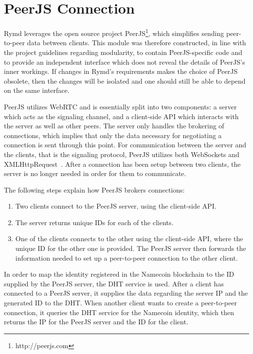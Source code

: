 \section{PeerJS Connection}
\label{sec:p2p}

Rymd leverages the open source project PeerJS\footnote{http://peerjs.com}, which simplifies sending peer-to-peer data between clients. This module was therefore constructed, in line with the project guidelines regarding modularity, to contain PeerJS-specific code and to provide an independent interface which does not reveal the details of PeerJS's inner workings. If changes in Rymd's requirements makes the choice of PeerJS obsolete, then the changes will be isolated and one should still be able to depend on the same interface.

PeerJS utilizes WebRTC and is essentially split into two components: a server which acts as the signaling channel, and a client-side API which interacts with the server as well as other peers. The server only handles the brokering of connections, which implies that only the data necessary for negotiating a connection is sent through this point. For communication between the server and the clients, that is the signaling protocol, PeerJS utilizes both WebSockets and XMLHttpRequest~\cite{PeerjsGithub:2014:Online}. After a connection has been setup between two clients, the server is no longer needed in order for them to communicate.

The following steps explain how PeerJS brokers connections:
\begin{enumerate}
\item Two clients connect to the PeerJS server, using the client-side API.
\item The server returns unique IDs for each of the clients.
\item One of the clients connects to the other using the client-side API, where the unique ID for the other one is provided. The PeerJS server then forwards the information needed to set up a peer-to-peer connection to the other client.
\end{enumerate}

In order to map the identity registered in the Namecoin blockchain to the ID supplied by the PeerJS server, the DHT service is used. After a client has connected to a PeerJS server, it supplies the data regarding the server IP and the generated ID to the DHT. When another client wants to create a peer-to-peer connection, it queries the DHT service for the Namecoin identity, which then returns the IP for the PeerJS server and the ID for the client.

